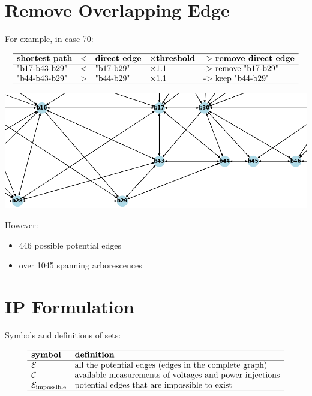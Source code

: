 \documentclass[
]{book}
\providecommand{\tightlist}{%
  \setlength{\itemsep}{0pt}\setlength{\parskip}{0pt}}
\begin{document}
\hypertarget{overlapping}{%
\section{Remove Overlapping Edge}\label{overlapping}}

For example, in case-70:

\[
\begin{array}{lllll}
  \hline
  \textbf{shortest path} & <
  & \textbf{direct edge} & \times \textbf{threshold}
  & \text{-> } \textbf{remove direct edge} \\
  \hline
  \text{"b17‐b43-b29"} & < & \text{"b17-b29"} & \times 1.1
  & \text{-> remove "b17-b29"} \\
  \text{"b44‐b43-b29"} & > & \text{"b44-b29"} & \times 1.1
  & \text{-> keep "b44-b29"} \\
  \hline
\end{array}
\]

\begin{center}\includegraphics[width=0.7\linewidth]{Pictures/overlapGeth} \end{center}

However:

\begin{itemize}
\tightlist
\item
  446 possible potential edges
\item
  over 1045 spanning arborescences
\end{itemize}

\hypertarget{ip-formulation}{%
\section{IP Formulation}\label{ip-formulation}}

Symbols and definitions of sets:

\[
\begin{array}{ll}
  \hline
  \textbf{symbol} & \textbf{definition} \\
  \hline
  \mathcal{E}
  & \text{all the potential edges (edges in the complete graph)} \\
  \mathcal{C}
  & \text{available measurements of voltages and power injections} \\
  \mathcal{E}_\text{impossible}
  & \text{potential edges that are impossible to exist} \\
  \hline
\end{array}
\]
\end{document}
